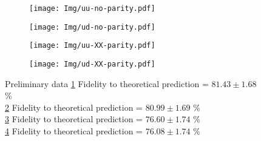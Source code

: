 \begin{figure}[htbp]
    \begin{subfigure}[t]{0.49\textwidth}\centering
        \caption{}
        \texttt{[image: Img/uu-no-parity.pdf]}
        \label{fig:uu-init }
    \end{subfigure}
    \begin{subfigure}[t]{0.49\textwidth}\centering
        \caption{}
        \texttt{[image: Img/ud-no-parity.pdf]}
        \label{fig:ud-init }
    \end{subfigure}

    \begin{subfigure}[t]{0.49\textwidth}\centering
        \caption{}
        \texttt{[image: Img/uu-XX-parity.pdf]}
        \label{fig:uu-XX}
    \end{subfigure}
    \begin{subfigure}[t]{0.49\textwidth}\centering
        \caption{}
        \texttt{[image: Img/ud-XX-parity.pdf]}
        \label{fig:ud-XX}
    \end{subfigure}
    \caption{ Preliminary data
    \cref{fig:uu-init } Fidelity to theoretical prediction  = $81.43 \pm 1.68$ \% \\
    \cref{fig:ud-init } Fidelity to theoretical prediction  = $80.99 \pm 1.69$ \% \\
    \cref{fig:uu-XX}  Fidelity to theoretical prediction  = $76.60 \pm 1.74$ \% \\
    \cref{fig:ud-XX}  Fidelity to theoretical prediction  = $76.08 \pm 1.74$ \%
    }
    \label{fig:2qubitTomos}
\end{figure}


%





